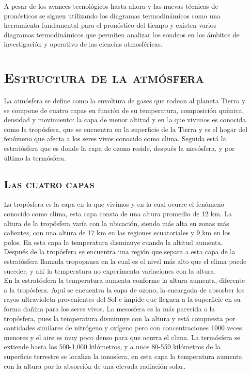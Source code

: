 \documentclass[12pt]{article}
\begin{document}
A pesar de los avances tecnológicos hasta ahora y las nuevas técnicas de pronósticos se siguen utilizando los diagramas termodinámicos como una herramienta fundamental para el pronóstico del tiempo y existen varios diagramas termodinámicos que permiten analizar los sondeos en los ámbitos de investigación y operativo de las ciencias atmosféricas.

\pagebreak


\section{\textsc{\Large Estructura de la atmósfera}}
La atmósfera se define como la envoltura de gases que rodean al planeta Tierra y se compone de cuatro capas en función de su temperatura, composición química, densidad y movimiento: la capa de menor altitud y en la que vivimos es conocida como la tropósfera, que se encuentra en la superficie de la Tierra y es el hogar del fenómeno que afecta a los seres vivos conocido como clima. Seguida está la estratósfera que es donde la capa de ozono reside, después la mesósfera, y por último la termósfera. 


\subsection{\textsc{Las cuatro capas}}
La tropósfera es la capa en la que vivimos y en la cual ocurre el fenómeno conocido como clima, esta capa consta de una altura promedio de 12 km. La altura de la tropósfera varía con la ubicación, siendo más alta en zonas más calientes, con una altura de 17 km en las regiones ecuatoriales y 9 km en los polos. En esta capa la temperatura disminuye cuando la altitud aumenta. Después de la tropósfera se encuentra una región que separa a esta capa de la estratósfera llamada tropopausa en la cual es el nivel más alto que el clima puede suceder, y ahí la temperatura no experimenta variaciones con la altura. \\

En la estratósfera la temperatura aumenta conforme la altura aumenta, diferente a la tropósfera. Aquí se encuentra la capa de ozono, la encargada de absorber los rayos ultravioleta provenientes del Sol e impide que lleguen a la superficie en su forma dañina para los seres vivos. La mesosfera es la más parecida a la tropósfera, pues la temperatura disminuye con la altura y está compuesta por cantidades similares de nitrógeno y oxígeno pero con concentraciones 1000 veces menores y el aire es muy poco denso para que ocurra el clima. La termósfera se extiende hasta los 500-1,000 kilómetros, y a unos 80-550 kilómetros de la superficie terrestre se localiza la ionosfera, en esta capa la temperatura aumenta con la altura por la absorción de una elevada radiación solar.
\end{document}
